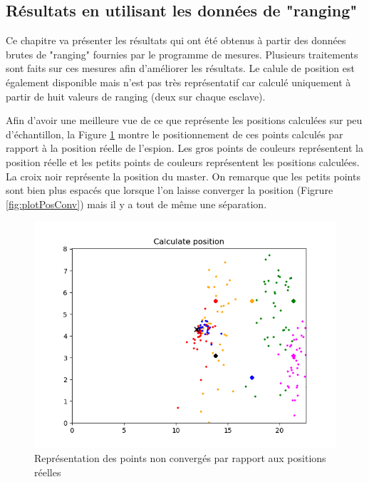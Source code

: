 \subsection{Résultats en utilisant les données de "ranging"}
Ce chapitre va présenter les résultats qui ont été obtenus à partir des données brutes de "ranging" fournies par le programme de mesures. Plusieurs traitements sont faits sur ces mesures afin d'améliorer les résultats. Le calule de position est également disponible mais n'est pas très représentatif car calculé uniquement à partir de huit valeurs de ranging (deux sur chaque esclave).


Afin d'avoir une meilleure vue de ce que représente les positions calculées sur peu d'échantillon, la Figure \ref{fig:plotPos} montre le positionnement de ces points calculés par rapport à la position réelle de l'espion. Les gros points de couleurs représentent la position réelle et les petits points de couleurs représentent les positions calculées. La croix noir représente la position du master. On remarque que les petits points sont bien plus espacés que lorsque l'on laisse converger la position (Figrure \ref{fig:plotPosConv}) mais il y a tout de même une séparation.

\begin{figure}[htp]
	\begin{center}
		\includegraphics[scale=0.8]{figures/plot_pos.PNG}
		\caption{Représentation des points non convergés par rapport aux positions réelles}
		\label{fig:plotPos} %
	\end{center}
\end{figure}

